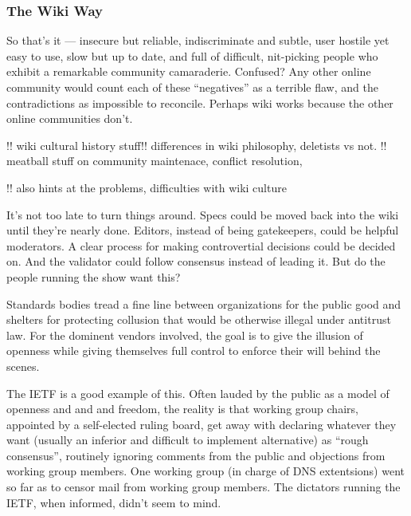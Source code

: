 \documentclass[10pt]{article}
\begin{document}
\begin{multicols}{2}
\hypertarget{the-wiki-way}{%
\subsubsection{The Wiki Way}\label{the-wiki-way}}

\begin{leftbar}
So that's it --- insecure but reliable, indiscriminate and subtle, user
hostile yet easy to use, slow but up to date, and full of difficult,
nit-picking people who exhibit a remarkable community camaraderie.
Confused? Any other online community would count each of these
``negatives'' as a terrible flaw, and the contradictions as impossible
to reconcile. Perhaps wiki works because the other online communities
don't. \cite{leufWikiWayQuick2001a, -l, 329} 
\end{leftbar}

!! wiki cultural history stuff!! differences in wiki philosophy,
deletists vs not. !! meatball stuff on community maintenace, conflict
resolution,

!! also hints at the problems, difficulties with wiki culture

\begin{leftbar}
It's not too late to turn things around. Specs could be moved back into
the wiki until they're nearly done. Editors, instead of being
gatekeepers, could be helpful moderators. A clear process for making
controvertial decisions could be decided on. And the validator could
follow consensus instead of leading it. But do the people running the
show want this?

Standards bodies tread a fine line between organizations for the public
good and shelters for protecting collusion that would be otherwise
illegal under antitrust law. For the dominent vendors involved, the goal
is to give the illusion of openness while giving themselves full control
to enforce their will behind the scenes.

The IETF is a good example of this. Often lauded by the public as a
model of openness and and and freedom, the reality is that working group
chairs, appointed by a self-elected ruling board, get away with
declaring whatever they want (usually an inferior and difficult to
implement alternative) as ``rough consensus'', routinely ignoring
comments from the public and objections from working group members. One
working group (in charge of DNS extentsions) went so far as to censor
mail from working group members. The dictators running the IETF, when
informed, didn't seem to mind.


\end{leftbar}
\end{multicols}
\end{document}
